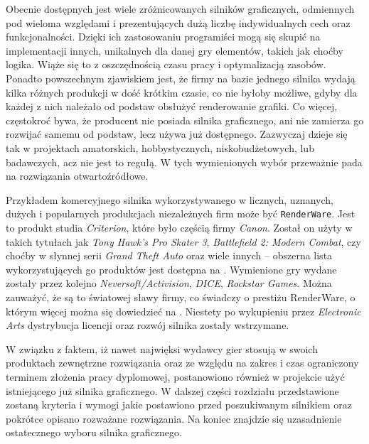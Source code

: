 \documentclass[11pt]{mwrep}
\begin{document}
    Obecnie dostępnych jest wiele zróżnicowanych silników graficznych, odmiennych pod wieloma względami i prezentujących dużą liczbę indywidualnych cech oraz funkcjonalności. Dzięki ich zastosowaniu programiści mogą się skupić na implementacji innych, unikalnych dla danej gry elementów, takich jak choćby logika. Wiąże się to z oszczędnością czasu pracy i optymalizacją zasobów. Ponadto powszechnym zjawiskiem jest, że firmy na bazie jednego silnika wydają kilka różnych produkcji w dość krótkim czasie, co nie byłoby możliwe, gdyby dla każdej z nich należało od podstaw obsłużyć renderowanie grafiki. Co więcej, częstokroć bywa, że producent nie posiada silnika graficznego, ani nie zamierza go rozwijać samemu od podstaw, lecz używa już dostępnego. Zazwyczaj dzieje się tak w projektach amatorskich, hobbystycznych, niskobudżetowych, lub badawczych, acz nie jest to regułą. W tych wymienionych wybór przeważnie pada na rozwiązania otwartoźródłowe.

    Przykładem komercyjnego silnika wykorzystywanego w licznych, uznanych, dużych i popularnych produkcjach niezależnych firm może być \texttt{RenderWare}. Jest to produkt studia \textit{Criterion}, które było częścią firmy \textit{Canon}. Został on użyty w takich tytułach jak \textit{Tony Hawk's Pro Skater 3}, \textit{Battlefield 2: Modern Combat}, czy choćby w słynnej serii \textit{Grand Theft Auto} oraz wiele innych -- obszerna lista wykorzystujących go produktów jest dostępna na \cite{renderware:list}. Wymienione gry wydane zostały przez kolejno  \textit{Neversoft/Activision}, \textit{DICE}, \textit{Rockstar Games}. Można zauważyć, że są to światowej sławy firmy, co świadczy o prestiżu RenderWare, o którym więcej można się dowiedzieć na \cite{renderware}. Niestety po wykupieniu przez \textit{Electronic Arts} dystrybucja licencji oraz rozwój silnika zostały wstrzymane.


    W związku z faktem, iż nawet najwięksi wydawcy gier stosują w swoich produktach zewnętrzne rozwiązania oraz ze względu na zakres i czas ograniczony terminem złożenia pracy dyplomowej, postanowiono również w projekcie użyć istniejącego już silnika graficznego. W dalszej części rozdziału przedstawione zostaną kryteria i wymogi jakie postawiono przed poszukiwanym silnikiem oraz pokrótce opisano rozważane rozwiązania. Na koniec znajdzie się uzasadnienie ostatecznego wyboru silnika graficznego.
\end{document}
